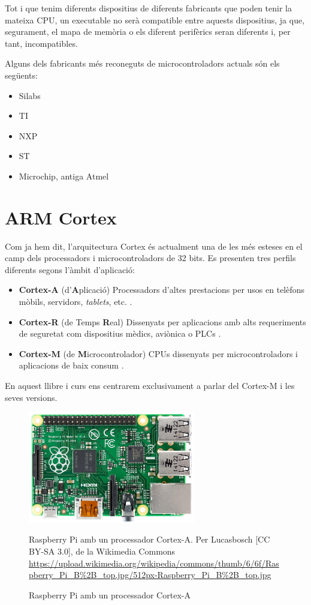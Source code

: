 Tot i que tenim diferents dispositius de diferents fabricants que poden tenir la mateixa CPU, un executable no serà compatible entre aquests dispositius, ja que, segurament, el mapa de memòria o els diferent perifèrics seran diferents i, per tant, incompatibles.

Alguns dels fabricants més reconeguts de microcontroladors actuals són els següents:
\begin{itemize}
 \item \acrfull{Silabs} \cite{SiLabs}
 \item \acrfull{TI} \cite{TI}
 \item \acrfull{NXP} \cite{NXP}
 \item \acrfull{ST} \cite{ST}
 \item Microchip, antiga Atmel \cite{Microchip}
\end{itemize}

\section{ARM Cortex}
\label{sec:cortex}
Com ja hem dit, l'arquitectura \gls{Cortex} és actualment una de les més esteses en el camp dels processadors i microcontroladors de 32 bits. Es presenten tres perfils diferents segons l'àmbit d'aplicació:
\begin{itemize}
 \item {\bf Cortex-A} (d'{\bf A}plicació) Processadors d'altes prestacions per usos en telèfons mòbils, servidors, {\em tablets}, etc. \cite{CortexA}.
 \item {\bf Cortex-R} (de Temps {\bf R}eal) Dissenyats per aplicacions amb alts requeriments de seguretat com dispositius mèdics, aviònica o \glspl{PLC} \cite{CortexR}.
 \item {\bf Cortex-M} (de {\bf M}icrocontrolador) CPUs dissenyats per microcontroladors i aplicacions de baix consum \cite{CortexM}.
\end{itemize}

En aquest llibre i curs ens centrarem exclusivament a parlar del Cortex-M i les seves versions.

\begin{figure}
 \centering
 \includegraphics[width=0.65\textwidth, keepaspectratio]{imatges/Raspberry_Pi}
 \caption{Raspberry Pi amb un processador Cortex-A}{Raspberry Pi amb un processador Cortex-A. Per Lucasbosch [CC BY-SA 3.0], de la Wikimedia Commons \url{https://upload.wikimedia.org/wikipedia/commons/thumb/6/6f/Raspberry_Pi_B\%2B_top.jpg/512px-Raspberry_Pi_B\%2B_top.jpg}}
 \label{fig:Raspberry_Pi}
\end{figure}

